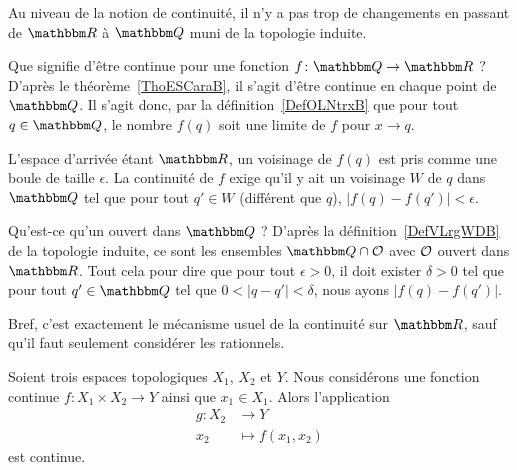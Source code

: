 Au niveau de la notion de continuité, il n'y a pas trop de changements en passant de \( \eR\) à \( \eQ\) muni de la topologie induite.

\begin{example}     \label{EXooHWIIooYYbfGE}
    Que signifie d'être continue pour une fonction \( f\colon \eQ\to \eR\) ? D'après le théorème~\ref{ThoESCaraB}, il s'agit d'être continue en chaque point de \( \eQ\). Il s'agit donc, par la définition~\ref{DefOLNtrxB} que pour tout \( q\in \eQ\), le nombre \( f(q)\) soit une limite de \( f\) pour \( x\to q\).

    L'espace d'arrivée étant \( \eR\), un voisinage de \( f(q)\) est pris comme une boule de taille \( \epsilon\). La continuité de \( f\) exige qu'il y ait un voisinage \( W\) de \( q\) dans \( \eQ\) tel que pour tout \( q'\in W\) (différent que \( q\)), \( | f(q)-f(q') |<\epsilon\).

    Qu'est-ce qu'un ouvert dans \( \eQ\) ? D'après la définition~\ref{DefVLrgWDB} de la topologie induite, ce sont les ensembles \( \eQ\cap\mO\) avec \( \mathcal{O}\) ouvert dans \( \eR\). Tout cela pour dire que pour tout \( \epsilon>0\), il doit exister \( \delta>0\) tel que pour tout \( q'\in \eQ\) tel que \( 0<| q-q' |<\delta\), nous ayons \( | f(q)-f(q') |\).

    Bref, c'est exactement le mécanisme usuel de la continuité sur \( \eR\), sauf qu'il faut seulement considérer les rationnels.
\end{example}

\begin{lemma}       \label{LEMooHAODooYSPmvH}
    Soient trois espaces topologiques \( X_1\), \( X_2\) et \( Y\). Nous considérons une fonction continue \( f\colon X_1\times X_2\to Y\) ainsi que \( x_1\in X_1\). Alors l'application
    \begin{equation}
        \begin{aligned}
            g\colon X_2&\to Y \\
            x_2&\mapsto f(x_1,x_2)
        \end{aligned}
    \end{equation}
    est continue.
\end{lemma}


